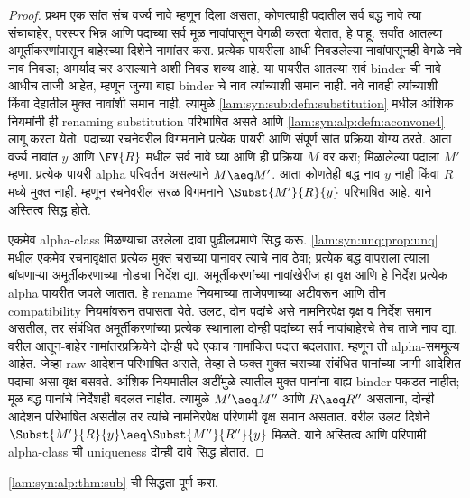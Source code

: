 \begin{proof}

प्रथम एक सांत संच वर्ज्य नावे म्हणून दिला असता, कोणत्याही
पदातील सर्व बद्ध नावे त्या संचाबाहेर, परस्पर भिन्न आणि
पदाच्या सर्व मूळ नावांपासून वेगळी करता येतात, हे पाहू.
सर्वांत आतल्या अमूर्तीकरणांपासून बाहेरच्या दिशेने नामांतर
करा. प्रत्येक पायरीला आधी निवडलेल्या नावांपासूनही वेगळे
नवे नाव निवडा; अमर्याद चर असल्याने अशी निवड शक्य आहे.
या पायरीत आतल्या सर्व binder ची नावे आधीच ताजी आहेत,
म्हणून जुन्या बाह्य binder चे नाव त्यांच्याशी समान नाही.
नवे नावही त्यांच्याशी किंवा देहातील मुक्त नावांशी समान नाही.
त्यामुळे \ref{lam:syn:sub:defn:substitution} मधील आंशिक
नियमांनी ही renaming substitution परिभाषित असते आणि
\ref{lam:syn:alp:defn:aconvone4} लागू करता येतो. पदाच्या रचनेवरील
विगमनाने प्रत्येक पायरी आणि संपूर्ण सांत प्रक्रिया योग्य ठरते.
आता वर्ज्य नावांत $y$ आणि $\FV{R}$ मधील सर्व नावे घ्या
आणि ही प्रक्रिया $M$ वर करा; मिळालेल्या पदाला $M'$ म्हणा.
प्रत्येक पायरी alpha परिवर्तन असल्याने $M\aeq M'$.
आता कोणतेही बद्ध नाव $y$ नाही किंवा $R$ मध्ये मुक्त नाही.
म्हणून रचनेवरील सरळ विगमनाने $\Subst{M'}{R}{y}$
परिभाषित आहे. याने अस्तित्व सिद्ध होते.

एकमेव alpha-class मिळण्याचा उरलेला दावा पुढीलप्रमाणे
सिद्ध करू. \ref{lam:syn:unq:prop:unq} मधील एकमेव रचनावृक्षात
प्रत्येक मुक्त चराच्या पानावर त्याचे नाव ठेवा; प्रत्येक बद्ध
वापराला त्याला बांधणाऱ्या अमूर्तीकरणाच्या नोडचा निर्देश द्या.
अमूर्तीकरणांच्या नावांखेरीज हा वृक्ष आणि हे निर्देश प्रत्येक
alpha पायरीत जपले जातात. हे rename नियमाच्या ताजेपणाच्या
अटीवरून आणि तीन compatibility नियमांवरून तपासता येते.
उलट, दोन पदांचे असे नामनिरपेक्ष वृक्ष व निर्देश समान असतील,
तर संबंधित अमूर्तीकरणांच्या प्रत्येक स्थानाला दोन्ही पदांच्या
सर्व नावांबाहेरचे तेच ताजे नाव द्या. वरील आतून-बाहेर
नामांतरप्रक्रियेने दोन्ही पदे एकाच नामांकित पदात बदलतात.
म्हणून ती alpha-सममूल्य आहेत.
जेव्हा raw आदेशन परिभाषित असते, तेव्हा ते फक्त मुक्त
चराच्या संबंधित पानांच्या जागी आदेशित पदाचा असा वृक्ष बसवते.
आंशिक नियमातील अटींमुळे त्यातील मुक्त पानांना बाह्य binder
पकडत नाहीत; मूळ बद्ध पानांचे निर्देशही बदलत नाहीत.
त्यामुळे $M'\aeq M''$ आणि $R\aeq R''$ असताना,
दोन्ही आदेशन परिभाषित असतील तर त्यांचे नामनिरपेक्ष
परिणामी वृक्ष समान असतात. वरील उलट दिशेने
$\Subst{M'}{R}{y}\aeq\Subst{M''}{R''}{y}$ मिळते.
याने अस्तित्व आणि परिणामी alpha-class ची uniqueness
दोन्ही दावे सिद्ध होतात.
\end{proof}

\begin{prob}
  \ref{lam:syn:alp:thm:sub} ची सिद्धता पूर्ण करा.
\end{prob}

